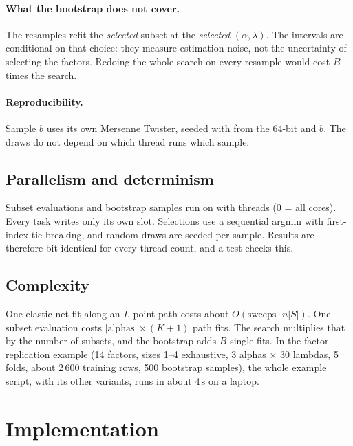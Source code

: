 \paragraph{What the bootstrap does not cover.} The resamples refit the \emph{selected} subset
at the \emph{selected} $(\alpha,\lambda)$. The intervals are conditional on that choice: they
measure estimation noise, not the uncertainty of selecting the factors. Redoing the whole
search on every resample would cost $B$ times the search.

\paragraph{Reproducibility.} Sample $b$ uses its own Mersenne Twister, seeded with
 from the 64-bit  and $b$. The draws do not depend
on which thread runs which sample.

\subsection{Parallelism and determinism}\label{en:sec:parallel}
Subset evaluations and bootstrap samples run on  with
 threads (0 = all cores). Every task writes only its own slot. Selections
use a sequential argmin with first-index tie-breaking, and random draws are seeded per
sample. Results are therefore bit-identical for every thread count, and a test checks this.

\subsection{Complexity}
One elastic net fit along an $L$-point path costs about $O(\text{sweeps}\cdot n|S|)$. One
subset evaluation costs $|\text{alphas}|\times(K+1)$ path fits. The search multiplies that by
the number of subsets, and the bootstrap adds $B$ single fits. In the factor replication
example (14 factors, sizes 1--4 exhaustive, 3 alphas $\times$ 30 lambdas, 5 folds, about
2\,600 training rows, 500 bootstrap samples), the whole example script, with its other
variants, runs in about 4\,s on a laptop.

\section{Implementation}


